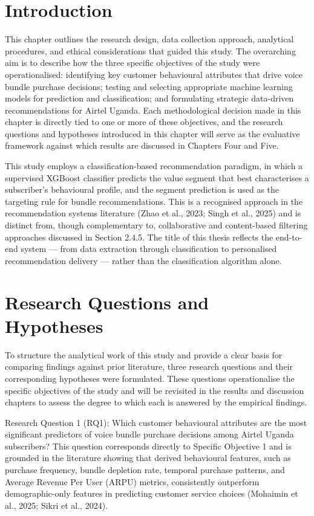
\section{Introduction}

This chapter outlines the research design, data collection approach, analytical procedures, and ethical considerations that guided this study. The overarching aim is to describe how the three specific objectives of the study were operationalised: identifying key customer behavioural attributes that drive voice bundle purchase decisions; testing and selecting appropriate machine learning models for prediction and classification; and formulating strategic data-driven recommendations for Airtel Uganda. Each methodological decision made in this chapter is directly tied to one or more of these objectives, and the research questions and hypotheses introduced in this chapter will serve as the evaluative framework against which results are discussed in Chapters Four and Five.

This study employs a classification-based recommendation paradigm, in which a supervised XGBoost classifier predicts the value segment that best characterises a subscriber's behavioural profile, and the segment prediction is used as the targeting rule for bundle recommendations. This is a recognised approach in the recommendation systems literature (Zhao et al., 2023; Singh et al., 2025) and is distinct from, though complementary to, collaborative and content-based filtering approaches discussed in Section 2.4.5. The title of this thesis reflects the end-to-end system — from data extraction through classification to personalised recommendation delivery — rather than the classification algorithm alone.

\section{Research Questions and Hypotheses}

To structure the analytical work of this study and provide a clear basis for comparing findings against prior literature, three research questions and their corresponding hypotheses were formulated. These questions operationalise the specific objectives of the study and will be revisited in the results and discussion chapters to assess the degree to which each is answered by the empirical findings.

Research Question 1 (RQ1): Which customer behavioural attributes are the most significant predictors of voice bundle purchase decisions among Airtel Uganda subscribers? This question corresponds directly to Specific Objective 1 and is grounded in the literature showing that derived behavioural features, such as purchase frequency, bundle depletion rate, temporal purchase patterns, and Average Revenue Per User (ARPU) metrics, consistently outperform demographic-only features in predicting customer service choices (Mohaimin et al., 2025; Sikri et al., 2024).

